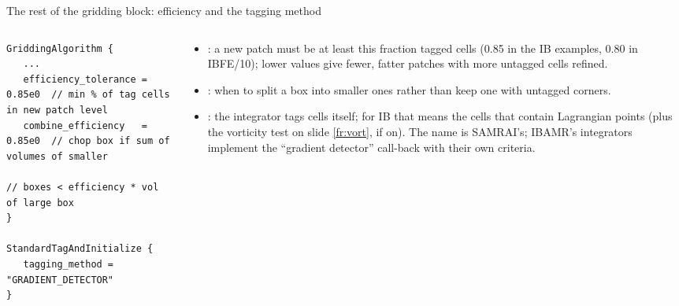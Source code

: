 \documentclass[aspectratio=169,11pt]{beamer}
\begin{document}
\begin{frame}[fragile]{The rest of the gridding block: efficiency and the tagging method}
\label{fr:gridding}
\begin{columns}[T,onlytextwidth]
\begin{column}{0.5\textwidth}
\begin{lstlisting}[style=inputtiny]
GriddingAlgorithm {
   ...
   efficiency_tolerance = 0.85e0  // min % of tag cells in new patch level
   combine_efficiency   = 0.85e0  // chop box if sum of volumes of smaller
                                  // boxes < efficiency * vol of large box
}

StandardTagAndInitialize {
   tagging_method = "GRADIENT_DETECTOR"
}
\end{lstlisting}
\end{column}
\begin{column}{0.48\textwidth}
\small
\begin{itemize}
  \item {}: a new patch must be at least this fraction tagged cells (0.85 in the IB examples, 0.80 in IBFE/10); lower values give fewer, fatter patches with more untagged cells refined.
  \item {}: when to split a box into smaller ones rather than keep one with untagged corners.
  \item {}: the integrator tags cells itself; for IB that means the cells that contain Lagrangian points (plus the vorticity test on slide \ref{fr:vort}, if on). The name is SAMRAI's; IBAMR's integrators implement the ``gradient detector'' call-back with their own criteria.
\end{itemize}
\end{column}
\end{columns}
\end{frame}
\end{document}
